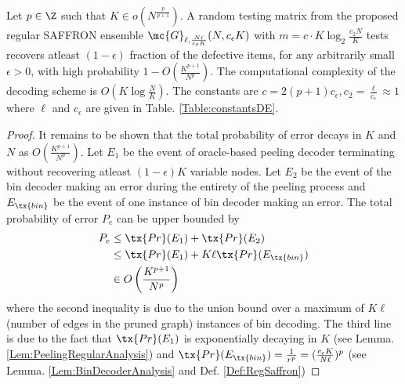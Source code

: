 \documentclass[conference,twocolumn]{IEEEtran}
\def\ceps{c_{\epsilon}}
\begin{document}
\begin{theorem}
\label{Thm:NoiselessMain}
Let $p\in\Z$ such that $K\in o(N^{\frac{p}{p+1}})$. A random testing matrix from the proposed regular SAFFRON ensemble $\mc{G}_{\ell,\frac{N\ell}{\ceps K}}(N,\ceps K)$ with $m=c\cdot K\log_{2}\frac{c_2 N}{K}$ tests recovers atleast $(1-\epsilon)$ fraction of the defective items, for any arbitrarily small $\epsilon>0$, with high probability $1-O\left(\frac{K^{p+1}}{N^p}\right)$. The computational complexity of the decoding scheme is $O(K\log \frac{N}{K})$. The constants are $c=2(p+1)\ceps, c_2=\frac{\ell}{\ceps}\approx 1$ where $\ell$ and $\ceps$ are given in Table. \ref{Table:constantsDE}.
\end{theorem}
\begin{proof}
It remains to be shown that the total probability of error decays in $K$ and $N$ as $O\left(\frac{K^{p+1}}{N^p}\right)$. Let $E_1$ be the event of oracle-based peeling decoder terminating without recovering atleast $(1-\epsilon)K$ variable nodes. Let $E_2$ be the event of the bin decoder making an error during the entirety of the peeling process and $E_{\tx{bin}}$ be the event of one instance of bin decoder making an error. The total probability of error $P_e$ can be upper bounded by 
\begin{align*}
P_e &\leq \tx{Pr}(E_1)+ \tx{Pr}(E_2)\\
               &\leq \tx{Pr}(E_1)+ K\ell\tx{ Pr}(E_{\tx{bin}})\\
               &\in O\left(\frac{K^{p+1}}{N^p}\right)
\end{align*}
where the second inequality is due to the union bound over a maximum of $K\ell$ (number of edges in the pruned graph) instances of bin decoding. The third line is due to the fact that $\tx{Pr}(E_1)$ is exponentially decaying in $K$ (see Lemma. \ref{Lem:PeelingRegularAnalysis}) and $\tx{Pr}(E_{\tx{bin}})=\frac{1}{r^p}=(\frac{\ceps K}{N\ell})^p$ (see Lemma. \ref{Lem:BinDecoderAnalysis} and Def. \ref{Def:RegSaffron})
\end{proof}
\end{document}
